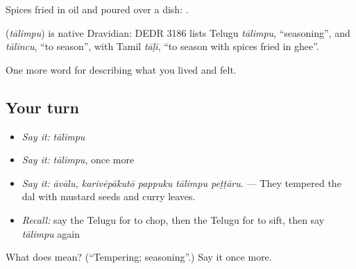 Spices fried in oil and poured over a dish:  .

\begin{cousinweb}
\textbf{} (\emph{tālimpu}) is native Dravidian: DEDR 3186 lists Telugu \emph{tālimpu}, \textquotedblleft{}seasoning\textquotedblright{}, and \emph{tālincu}, \textquotedblleft{}to season\textquotedblright{}, with Tamil \emph{tāḷi}, \textquotedblleft{}to season with spices fried in ghee\textquotedblright{}.
\end{cousinweb}

\begin{grammarlens}[title={What you've built}]
One more word for describing what you lived and felt.
\end{grammarlens}

\subsection*{Your turn}
\begin{itemize}
\raggedright
  \item \emph{Say it:} \emph{tālimpu}
  \item \emph{Say it:} \emph{tālimpu}, once more
  \item \emph{Say it:} \emph{āvālu, karivēpākutō pappuku tālimpu peṭṭāru.} — They tempered the dal with mustard seeds and curry leaves.
  \item \emph{Recall:} say the Telugu for to chop, then the Telugu for to sift, then say \emph{tālimpu} again
\end{itemize}

\begin{tcolorbox}[breakable,colback=teal!4,colframe=teal!35!black,title={Before you move on}]
What does  mean? (\textquotedblleft{}Tempering; seasoning\textquotedblright{}.) Say it once more.
\end{tcolorbox}
